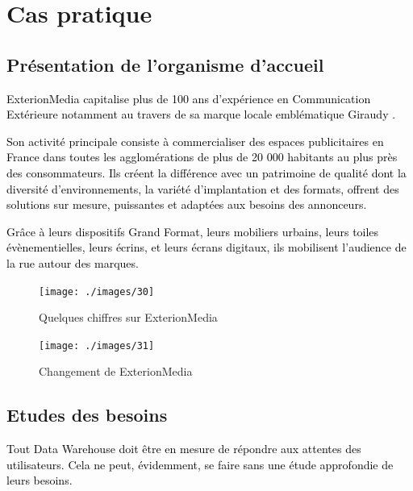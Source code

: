 \documentclass[a4paper,12pt]{report}
\begin{document}
\newpage 


\chapter{Cas pratique}
\section{Présentation de l’organisme d’accueil }
\textcolor{black}{ExterionMedia capitalise plus de 100 ans d’expérience en Communication Extérieure notamment au travers de sa marque locale emblématique Giraudy \citep{Exterion}.}

\textcolor{black}{Son activité principale consiste à commercialiser des espaces publicitaires en France dans toutes les agglomérations de plus de 20 000 habitants au plus près des consommateurs. Ils créent la différence avec un patrimoine de qualité dont la diversité d’environnements, la variété d’implantation et des formats, offrent des solutions sur mesure, puissantes et adaptées aux besoins des annonceurs\citep{Exterion}.}

\textcolor{black}{Grâce à leurs dispositifs Grand Format, leurs mobiliers urbains, leurs toiles évènementielles, leurs écrins, et leurs écrans digitaux, ils mobilisent l’audience de la rue autour des marques\citep{Exterion}.}


\begin{figure}[H]

\begin{center}
\texttt{[image: ./images/30]}
\end{center}

\caption{Quelques chiffres sur ExterionMedia \citep{Exterion}}
\label{fig:1}

\end{figure}

\begin{figure}[H]

\begin{center}
\texttt{[image: ./images/31]}
\end{center}

\caption{Changement de ExterionMedia \citep{Exterion}}
\label{fig:1}

\end{figure}


\section{Etudes des besoins }
\textcolor{black}{Tout Data Warehouse doit être en mesure de répondre aux attentes des utilisateurs.
Cela ne peut, évidemment, se faire sans une étude approfondie de leurs besoins. }
\end{document}

